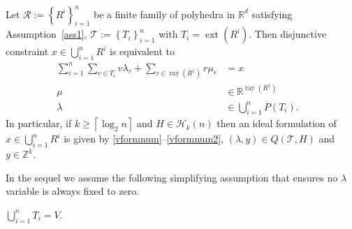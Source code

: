 \documentclass[mnsc]{informs3}
\newcommand{\set}[1]{\left\{#1\right\}}                     %
\newcommand{\bra}[1]{\left(#1\right)}
\newcommand{\Real}{\mathbb R}
\DeclareMathOperator{\ext}{ext}
\DeclareMathOperator{\ray}{ray}
\begin{document}
\begin{proposition}\label{vformprop}Let $\mathcal{R}:=\set{R^i}_{i=1}^n$ be a finite family of polyhedra in $\Real^d$ satisfying Assumption~\ref{ass1},  $\mathcal{T}:=\set{T_i}_{i=1}^n$ with $T_i=\ext\bra{R^i}$. Then disjunctive constraint $x\in \bigcup_{i=1}^n R^i$ is equivalent to 
  \begin{subequations}\label{vformexunion}
      \begin{alignat}{3}
    \sum\nolimits_{i=1}^n\sum\nolimits_{v\in T_i}  v \lambda_{v}+\sum\nolimits_{r\in \ray\bra{R^1}} r \mu_r&=x&\label{vformnum}\\
            \mu&\in \Real^{\ray\bra{R^1}}\label{vformnum2}\\
            \lambda&\in \bigcup_{i=1}^n P\bra{T_i}\label{vformlambda}.
    \end{alignat}
  \end{subequations}
In particular, if $k\geq \left\lceil \log_2 n\right\rceil$ and $H\in \mathcal{H}_k(n)$ then an ideal formulation of $x\in \bigcup_{i=1}^n R^i$ is given by \eqref{vformnum}--\eqref{vformnum2}, $\bra{\lambda,y}\in Q\bra{\mathcal{T},H} $ and $y\in \mathbb{Z}^k$.
\end{proposition}

In the sequel we assume the following simplifying assumption that ensures no $\lambda$ variable is always fixed to zero. 

\begin{assumption} \label{assumption0} $\bigcup_{i=1}^n T_i=V$.
\end{assumption}
\end{document}
